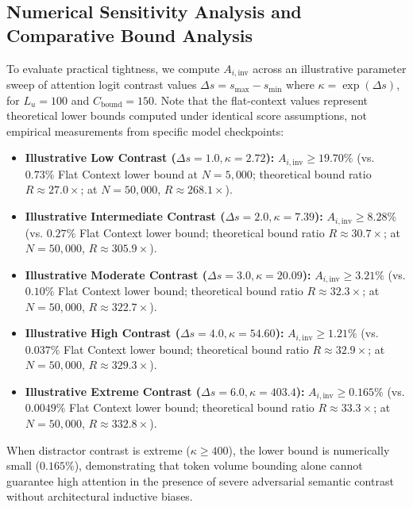 \documentclass[11pt,a4paper]{article}
\begin{document}
\subsection{Numerical Sensitivity Analysis and Comparative Bound Analysis}
To evaluate practical tightness, we compute $A_{i, \text{inv}}$ across an illustrative parameter sweep of attention logit contrast values $\Delta s = s_{\max} - s_{\min}$ where $\kappa = \exp(\Delta s)$, for $L_u = 100$ and $C_{\text{bound}} = 150$. Note that the flat-context values represent theoretical lower bounds computed under identical score assumptions, not empirical measurements from specific model checkpoints:
\begin{itemize}
    \item \textbf{Illustrative Low Contrast ($\Delta s = 1.0, \kappa = 2.72$):} $A_{i,\text{inv}} \ge 19.70\%$ (vs. $0.73\%$ Flat Context lower bound at $N=5{,}000$; theoretical bound ratio $R \approx 27.0\times$; at $N=50{,}000$, $R \approx 268.1\times$).
    \item \textbf{Illustrative Intermediate Contrast ($\Delta s = 2.0, \kappa = 7.39$):} $A_{i,\text{inv}} \ge 8.28\%$ (vs. $0.27\%$ Flat Context lower bound; theoretical bound ratio $R \approx 30.7\times$; at $N=50{,}000$, $R \approx 305.9\times$).
    \item \textbf{Illustrative Moderate Contrast ($\Delta s = 3.0, \kappa = 20.09$):} $A_{i,\text{inv}} \ge 3.21\%$ (vs. $0.10\%$ Flat Context lower bound; theoretical bound ratio $R \approx 32.3\times$; at $N=50{,}000$, $R \approx 322.7\times$).
    \item \textbf{Illustrative High Contrast ($\Delta s = 4.0, \kappa = 54.60$):} $A_{i,\text{inv}} \ge 1.21\%$ (vs. $0.037\%$ Flat Context lower bound; theoretical bound ratio $R \approx 32.9\times$; at $N=50{,}000$, $R \approx 329.3\times$).
    \item \textbf{Illustrative Extreme Contrast ($\Delta s = 6.0, \kappa = 403.4$):} $A_{i,\text{inv}} \ge 0.165\%$ (vs. $0.0049\%$ Flat Context lower bound; theoretical bound ratio $R \approx 33.3\times$; at $N=50{,}000$, $R \approx 332.8\times$).
\end{itemize}
\noindent When distractor contrast is extreme ($\kappa \ge 400$), the lower bound is numerically small ($0.165\%$), demonstrating that token volume bounding alone cannot guarantee high attention in the presence of severe adversarial semantic contrast without architectural inductive biases.
\end{document}
